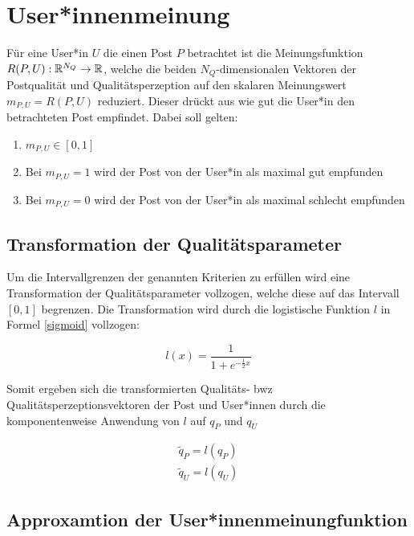 \chapter{User*innenmeinung}
\label{chapter:bewertungsfunktionen}


Für eine User*in $U$ die einen Post $P$ betrachtet ist die Meinungsfunktion $R(P,U): \mathbb{R}^{N_Q} \rightarrow \mathbb{R}$, welche die beiden $N_Q$-dimensionalen Vektoren der Postqualität und Qualitätsperzeption auf den skalaren Meinungswert $m_{P,U} = R(P,U)$ reduziert. Dieser drückt aus wie gut die User*in den betrachteten Post empfindet. Dabei soll gelten:

\begin{enumerate}
	\item $m_{P,U} \in [0,1]$
	\item Bei $m_{P,U} = 1$ wird der Post von der User*in als maximal gut empfunden
	\item Bei $m_{P,U} = 0$ wird der Post von der User*in als maximal schlecht empfunden
\end{enumerate}

\section{Transformation der Qualitätsparameter}

Um die Intervallgrenzen der genannten Kriterien zu erfüllen wird eine Transformation der Qualitätsparameter vollzogen, welche diese auf das Intervall $[0,1]$ begrenzen. Die Transformation wird durch die logistische Funktion $l$ in Formel \ref{sigmoid} vollzogen:



\begin{equation}
\label{sigmoid}
l(x) = \frac{1}{1 + e^{-\frac{1}{2}x}}
\end{equation}


Somit ergeben sich die transformierten Qualitäts- bwz Qualitätsperzeptionsvektoren der Post und User*innen durch die komponentenweise Anwendung von $l$ auf $q_P$ und $q_U$

\begin{align}
\tilde{q}_P = l(q_P) \\
\tilde{q}_U = l(q_U) 
\end{align}

\section{Approxamtion der User*innenmeinungfunktion}


